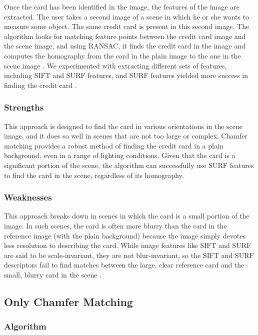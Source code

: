 \documentclass[10pt,twocolumn,letterpaper]{article}
\begin{document}
Once the card has been identified in the image, the features of the image are extracted. The user takes a second image of a scene in which he or she wants to measure some object. The same credit card is present in this second image. The algorithm looks for matching feature points between the credit card image and the scene image, and using RANSAC, it finds the credit card in the image and computes the homography from the card in the plain image to the one in the scene image \cite{ransac}. We experimented with extracting different sets of features, including SIFT and SURF features, and SURF features yielded more success in finding the credit card \cite{sift} \cite{surf}. 

\subsubsection{Strengths}

	This approach is designed to find the card in various orientations in the scene image, and it does so well in scenes that are not too large or complex. Chamfer matching provides a robust method of finding the credit card in a plain background, even in a range of lighting conditions. Given that the card is a significant portion of the scene, the algorithm can successfully use SURF features to find the card in the scene, regardless of its homography. 
	
\subsubsection{Weaknesses}

	This approach breaks down in scenes in which the card is a small portion of the image. In such scenes, the card is often more blurry than the card in the reference image (with the plain background) because the image simply devotes less resolution to describing the card. While image features like SIFT and SURF are said to be scale-invariant, they are not blur-invariant, so the SIFT and SURF descriptors fail to find matches between the large, clear reference card and the small, blurry card in the scene \cite{sift} \cite{surf}. 
	
\subsection{Only Chamfer Matching}
\subsubsection{Algorithm}
\end{document}
